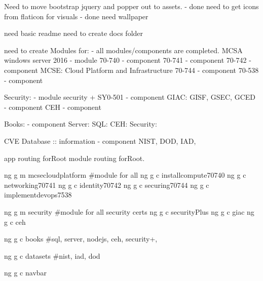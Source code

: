 Need to move bootstrap jquery and popper out to assets. - done
need to get icons from flaticon for visuals - done
need wallpaper

need basic readme
need to create docs folder

need to create Modules for: - all modules/components are completed.
MCSA windows server 2016 - module
70-740 - component
70-741 - component
70-742 - component
MCSE: Cloud Platform and Infrastructure
70-744 - component
70-538 - component

Security:  - module
security + SY0-501 - component
GIAC: GISF, GSEC, GCED - component
CEH - component

Books: - component
Server:
SQL:
CEH:
Security:

CVE Database :: information - component
NIST, DOD, IAD,

app routing forRoot
module routing forRoot.

ng g m mcsecloudplatform #module for all
ng g c installcompute70740
ng g c networking70741
ng g c identity70742
ng g c securing70744
ng g c implementdevops7538

ng g m security #module for all security certs
ng g c securityPlus
ng g c giac
ng g c ceh

ng g c books #sql, server, nodejs, ceh, security+,

ng g c datasets #nist, iad, dod

ng g c navbar
